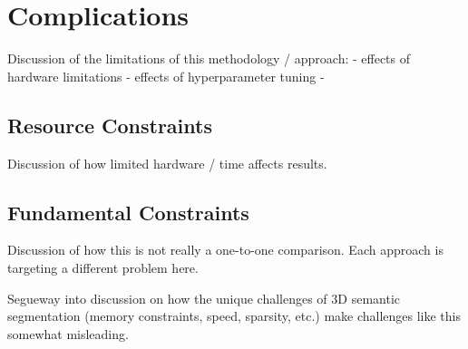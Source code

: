 \section{Complications}
\label{chap:complications}

Discussion of the limitations of this methodology / approach:
 - effects of hardware limitations
 - effects of hyperparameter tuning
 - 

\subsection{Resource Constraints}
\label{resource-constraints}

Discussion of how limited hardware / time affects results.

\subsection{Fundamental Constraints}
\label{fundamental-constraints}

Discussion of how this is not really a one-to-one comparison. Each approach is targeting a different problem here.

Segueway into discussion on how the unique challenges of 3D semantic segmentation (memory constraints, speed, sparsity, etc.) make challenges like this somewhat misleading.


